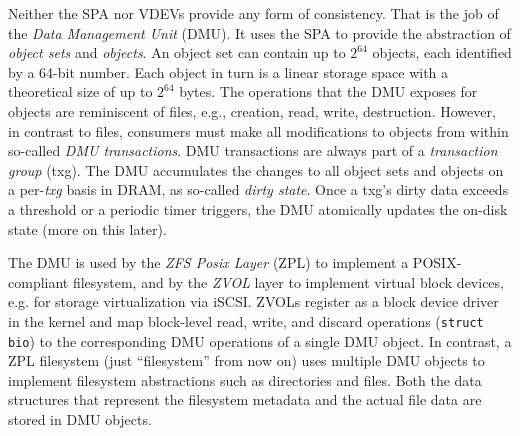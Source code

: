 \documentclass[12pt,a4paper,twoside]{book}
\begin{document}
Neither the SPA nor VDEVs provide any form of consistency.
That is the job of the \textit{Data Management Unit} (DMU).
It uses the SPA to provide the abstraction of \textit{object sets} and \textit{objects}.
An object set can contain up to $2^{64}$ objects, each identified by a 64-bit number.
Each object in turn is a linear storage space with a theoretical size of up to $2^{64}$ bytes.
The operations that the DMU exposes for objects are reminiscent of files, e.g., creation, read, write, destruction.
However, in contrast to files, consumers must make all modifications to objects from within so-called \textit{DMU transactions}.
DMU transactions are always part of a \textit{transaction group} (txg).
The DMU accumulates the changes to all object sets and objects on a per-\textit{txg} basis in DRAM, as so-called \textit{dirty state}.
Once a txg's dirty data exceeds a threshold or a periodic timer triggers, the DMU atomically updates the on-disk state (more on this later).

The DMU is used by the \textit{ZFS Posix Layer} (ZPL) to implement a POSIX-compliant filesystem, and by the \textit{ZVOL} layer to implement virtual block devices, e.g. for storage virtualization via iSCSI.
ZVOLs register as a block device driver in the kernel and map block-level read, write, and discard operations (\lstinline[style=figurepseudocode]{struct bio}) to the corresponding DMU operations of a single DMU object.
In contrast, a ZPL filesystem (just ``filesystem'' from now on) uses multiple DMU objects to implement filesystem abstractions such as directories and files.
Both the data structures that represent the filesystem metadata and the actual file data are stored in DMU objects.
\end{document}
